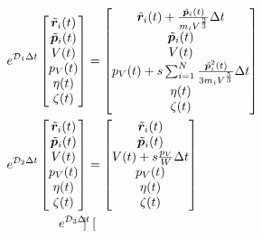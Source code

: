 \begin{align}
 e^{\mathcal{D}_{1} \Delta t}
 \begin{bmatrix}
  \Tilde{\bm{r}}_{i} (t) \\
  \Tilde{\bm{p}}_{i} (t) \\
  V (t) \\
  p_{V} (t) \\
  \eta (t) \\
  \zeta (t) \\
 \end{bmatrix}
 &=
 \begin{bmatrix}
  \Tilde{\bm{r}}_{i} (t) + \frac{\Tilde{\bm{p}}_{i}(t)}{m_{i} V^{\frac{2}{3}}} \Delta t \\
  \Tilde{\bm{p}}_{i} (t) \\
  V (t) \\
  p_{V} (t) + s \sum_{i=1}^{N} \frac{\Tilde{\bm{p}}_{i}^{2}(t)}{3 m_{i} V^{\frac{5}{3}}} \Delta t \\
  \eta (t) \\
  \zeta (t) \\
 \end{bmatrix}
 \label{eq:NoseAndersen24.1}
 \\
 e^{\mathcal{D}_{2} \Delta t}
 \begin{bmatrix}
  \Tilde{\bm{r}}_{i} (t) \\
  \Tilde{\bm{p}}_{i} (t) \\
  V (t) \\
  p_{V} (t) \\
  \eta (t) \\
  \zeta (t) \\
 \end{bmatrix}
 &=
 \begin{bmatrix}
  \Tilde{\bm{r}}_{i} (t) \\
  \Tilde{\bm{p}}_{i} (t) \\
  V (t) + s \frac{p_{V}}{W} \Delta t \\
  p_{V} (t) \\
  \eta (t) \\
  \zeta (t) \\
 \end{bmatrix}
 \label{eq:NoseAndersen24.2}
 \\
 e^{\mathcal{D}_{3} \Delta t}
 \begin{bmatrix}

\end{bmatrix}
\end{align}
